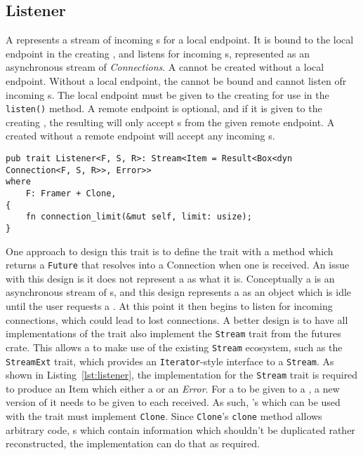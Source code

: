 \subsection{Listener}\label{subsec:listener}
A \listener{} represents a stream of incoming \connection{}s for a local endpoint.
It is bound to the local endpoint in the creating \preconnection{}, and listens for incoming \connection{}s,
represented as an asynchronous stream of \emph{Connections}.
A \listener{} cannot be created without a local endpoint.
Without a local endpoint, the \listener{} cannot be bound and cannot listen ofr incoming \connection{}s.
The local endpoint must be given to the creating \preconnection{} for use in the \texttt{listen()} method.
A remote endpoint is optional, and if it is given to the creating \preconnection{}, the resulting \listener{} will only
accept \connection{}s from the given remote endpoint.
A \listener{} created without a remote endpoint will accept any incoming \connection{}s.

\begin{lstlisting}[float=h, label=lst:listener, caption={The Listener trait, showing the Stream
implementation requirement for all implementers.}]
pub trait Listener<F, S, R>: Stream<Item = Result<Box<dyn Connection<F, S, R>>, Error>>
where
    F: Framer + Clone,
{
    fn connection_limit(&mut self, limit: usize);
}

\end{lstlisting}
One approach to design this trait is to define the trait with a method which returns a \texttt{Future} that resolves
into a Connection when one is received.
An issue with this design is it does not represent a \listener{} as what it is.
Conceptually a \listener{} is an asynchronous stream of \connection{}s, and this design represents a
\listener{} as an object which is idle until the user requests a \connection{}.
At this point it then begins to listen for incoming connections, which could lead to lost connections.
A better design is to have all implementations of the \listener{} trait also implement the \texttt{Stream} trait
from the futures crate.
This allows a \listener{} to make use of the existing \texttt{Stream} ecosystem, such as the \texttt{StreamExt}
trait, which provides an \texttt{Iterator}-style interface to a \texttt{Stream}.
As shown in Listing~\ref{lst:listener}, the implementation for the \texttt{Stream} trait is required to produce an Item
which either a \connection{} or an \emph{Error}.
For a \framer{} to be given to a \listener{}, a new version of it needs to be given to each \connection{}
received.
As such, \framer{}'s which can be used with the \listener{} trait must implement \texttt{Clone}.
Since \texttt{Clone}'s \texttt{clone} method allows arbitrary code, \framer{}s which contain information which
shouldn't be duplicated rather reconstructed, the implementation can do that as required.

